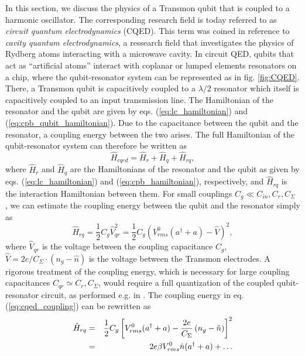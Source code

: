 In this section, we discuss the physics of a Transmon qubit that is coupled to a harmonic oscillator. The corresponding research field is today referred to as {\it circuit quantum electrodynamics} (CQED). This term was coined in reference to {\it cavity quantum electrodynamics}, a ressearch field that investigates the physics of Rydberg atoms interacting with a microwave cavity. In circuit QED, qubits that act as ``artificial atoms'' interact with coplanar or lumped elements resonators on a chip, where the qubit-resonator system can be represented as in fig. \ref{fig:CQED}. There, a Transmon qubit is capacitively coupled to a $\lambda/2$ resonator which itself is capacitively coupled to an input transmission line. The Hamiltonian of the resonator and the qubit are given by eqs. (\ref{eq:lc_hamiltonian}) and (\ref{eq:cpb_qubit_hamiltonian}). Due to the capacitance between the qubit and the resonator, a coupling energy between the two arises. The full Hamiltonian of the qubit-resonator system can therefore be written as
%
\begin{equation}
\hat{H}_{cqed} = \hat{H}_r+\hat{H}_q+\hat{H}_{rq},
\end{equation}
%
where $\hat{H}_{r}$ and $\hat{H}_q$ are the Hamiltonians of the resonator and the qubit as given by eqs. (\ref{eq:lc_hamiltonian}) and (\ref{eq:cpb_hamiltonian}), respectively, and $\hat{H}_{rq}$ is the interaction Hamiltonian between them. For small couplings $C_g \ll C_{in},C_r,C_\Sigma$ , we can estimate the coupling energy between the qubit and the resonator simply as
%
\begin{equation}
\hat{H}_{rq} = \frac{1}{2}C_{g}\hat{V}_{qr}^2 = \frac{1}{2}C_g\left(V^0_{rms}(a^\dagger+a)-\hat{V}\right)^2, \label{eq:cqed_coupling}
\end{equation}
%
where $\hat{V}_{qr}$ is the voltage between the coupling capacitance $C_g$, $\hat{V}=2e/C_\Sigma \cdot(n_g-\hat{n})$ is the voltage between the Transmon electrodes. A rigorous treatment of the coupling energy, which is necessary for large coupling capacitances $C_{qr}\simeq C_{r},C_\Sigma$, would require a full quantization of the coupled qubit-resonator circuit, as performed e.g. in \citep{nguyen_cooper_2008}. The coupling energy in eq. (\ref{eq:cqed_coupling}) can be rewritten as
%
\begin{eqnarray}
\hat{H}_{rq} & = & \frac{1}{2}C_g\left[V_{rms}^0(a^\dagger+a)-\frac{2e}{C_\Sigma}\left(n_g-\hat{n}\right)\right]^2 \notag \\
       & = & 2e \beta V_{rms}^0\hat{n}(a^\dagger+a) + \hdots \label{eq:cqed_coupling}
\end{eqnarray}
